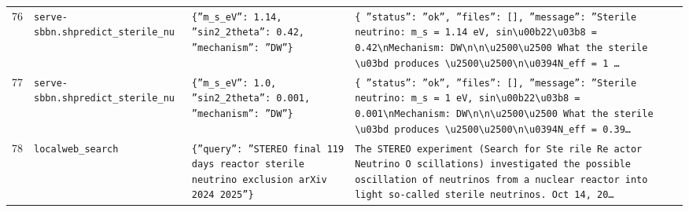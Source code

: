 \documentclass[11pt,a4paper]{article}
\begin{document}
\begin{longtable}{@{}p{}p{}p{}p{}@{}}
76 & \texttt{serve-sbbn.sh}\newline\texttt{predict\_\allowbreak{}sterile\_\allowbreak{}nu} & \texttt{\{''m\_\allowbreak{}s\_\allowbreak{}eV'':\allowbreak{} 1.14,\allowbreak{} ''sin2\_\allowbreak{}2theta'':\allowbreak{} 0.42,\allowbreak{} ''mechanism'':\allowbreak{} ''DW''\}\allowbreak{}} & \texttt{\{   ''status'':\allowbreak{} ''ok'',\allowbreak{}   ''files'':\allowbreak{} []\allowbreak{},\allowbreak{}   ''message'':\allowbreak{} ''Sterile neutrino:\allowbreak{} m\_\allowbreak{}s =\allowbreak{} 1.14 eV,\allowbreak{} sin\textbackslash{}\allowbreak{}u00b22\textbackslash{}\allowbreak{}u03b8 =\allowbreak{} 0.42\textbackslash{}\allowbreak{}nMechanism:\allowbreak{} DW\textbackslash{}\allowbreak{}n\textbackslash{}\allowbreak{}n\textbackslash{}\allowbreak{}u2500\textbackslash{}\allowbreak{}u2500 What the sterile \textbackslash{}\allowbreak{}u03bd produces \textbackslash{}\allowbreak{}u2500\textbackslash{}\allowbreak{}u2500\textbackslash{}\allowbreak{}n\textbackslash{}\allowbreak{}u0394N\_\allowbreak{}eff =\allowbreak{} 1 \ldots{}\allowbreak{}} \\
77 & \texttt{serve-sbbn.sh}\newline\texttt{predict\_\allowbreak{}sterile\_\allowbreak{}nu} & \texttt{\{''m\_\allowbreak{}s\_\allowbreak{}eV'':\allowbreak{} 1.0,\allowbreak{} ''sin2\_\allowbreak{}2theta'':\allowbreak{} 0.001,\allowbreak{} ''mechanism'':\allowbreak{} ''DW''\}\allowbreak{}} & \texttt{\{   ''status'':\allowbreak{} ''ok'',\allowbreak{}   ''files'':\allowbreak{} []\allowbreak{},\allowbreak{}   ''message'':\allowbreak{} ''Sterile neutrino:\allowbreak{} m\_\allowbreak{}s =\allowbreak{} 1 eV,\allowbreak{} sin\textbackslash{}\allowbreak{}u00b22\textbackslash{}\allowbreak{}u03b8 =\allowbreak{} 0.001\textbackslash{}\allowbreak{}nMechanism:\allowbreak{} DW\textbackslash{}\allowbreak{}n\textbackslash{}\allowbreak{}n\textbackslash{}\allowbreak{}u2500\textbackslash{}\allowbreak{}u2500 What the sterile \textbackslash{}\allowbreak{}u03bd produces \textbackslash{}\allowbreak{}u2500\textbackslash{}\allowbreak{}u2500\textbackslash{}\allowbreak{}n\textbackslash{}\allowbreak{}u0394N\_\allowbreak{}eff =\allowbreak{} 0.39\ldots{}\allowbreak{}} \\
78 & \texttt{local}\newline\texttt{web\_\allowbreak{}search} & \texttt{\{''query'':\allowbreak{} ''STEREO final 119 days reactor sterile neutrino exclusion arXiv 2024 2025''\}\allowbreak{}} & \texttt{The STEREO experiment (Search for Ste rile Re actor Neutrino O scillations)\allowbreak{} investigated the possible oscillation of neutrinos from a nuclear reactor into light so-called sterile neutrinos. Oct 14,\allowbreak{} 20\ldots{}\allowbreak{}} \\

\end{longtable}
\end{document}
